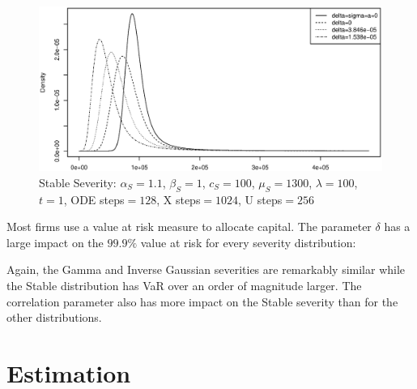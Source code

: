 \documentclass{article}
\theoremstyle{definition}
\newcommand{\adjustHeight}{\setlength{\abovecaptionskip}{-15pt}}
\begin{document}
\begin{figure}[H] 
\adjustHeight

\centering
\includegraphics[width=1\textwidth]{Figure6}
\caption{Stable Severity: \(\alpha_S=1.1\), \(\beta_S=1\), \(c_S=100\), \(\mu_S=1300\), \(\lambda=100\),  \(t=1\), ODE steps\(=128\), X steps\(=1024\), U steps\(=256\)}\label{comparePlotsStable}
\end{figure}

Most firms use a value at risk measure to allocate capital.  The parameter \(\delta\) has a large impact on the \(99.9\%\) value at risk for every severity distribution:


\vspace{10mm}

\vspace{10mm}

\vspace{10mm}

Again, the Gamma and Inverse Gaussian severities are remarkably similar while the Stable distribution has VaR over an order of magnitude larger.  The correlation parameter also has more impact on the Stable severity than for the other distributions.

\section{Estimation}
\end{document}
